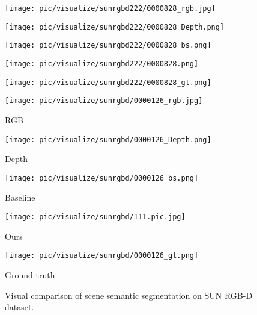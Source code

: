 \documentclass[lettersize,journal]{IEEEtran}
\begin{document}
\begin{figure*}[t]
\begin{minipage}[c]{0.158\linewidth}
        \texttt{[image: pic/visualize/sunrgbd222/0000828\_rgb.jpg]}
    \end{minipage} 
    \begin{minipage}[c]{0.158\linewidth}
        \texttt{[image: pic/visualize/sunrgbd222/0000828\_Depth.png]}
    \end{minipage}
    \begin{minipage}[c]{0.158\linewidth}
        \texttt{[image: pic/visualize/sunrgbd222/0000828\_bs.png]}
    \end{minipage} 
    \begin{minipage}[c]{0.158\linewidth}
        \texttt{[image: pic/visualize/sunrgbd222/0000828.png]}
    \end{minipage} 
    \begin{minipage}[c]{0.158\linewidth}
        \texttt{[image: pic/visualize/sunrgbd222/0000828\_gt.png]}
    \end{minipage}
    
\begin{minipage}[c]{0.158\linewidth}
        \texttt{[image: pic/visualize/sunrgbd/0000126\_rgb.jpg]}
    \centerline{RGB}
    \end{minipage} 
    \begin{minipage}[c]{0.158\linewidth}
        \texttt{[image: pic/visualize/sunrgbd/0000126\_Depth.png]}
    \centerline{Depth}
    \end{minipage} 
    \begin{minipage}[c]{0.158\linewidth}
        \texttt{[image: pic/visualize/sunrgbd/0000126\_bs.png]}
    \centerline{Baseline}
    \end{minipage} 
    \begin{minipage}[c]{0.158\linewidth}
        \texttt{[image: pic/visualize/sunrgbd/111.pic.jpg]}
    \centerline{Ours}
    \end{minipage} 
    \begin{minipage}[c]{0.158\linewidth}
        \texttt{[image: pic/visualize/sunrgbd/0000126\_gt.png]}
    \centerline{Ground truth}
    \end{minipage}
    \caption{Visual comparison of scene semantic segmentation on SUN RGB-D dataset.}
    \label{SUN RGB-D_result}
\end{figure*}
\end{document}
